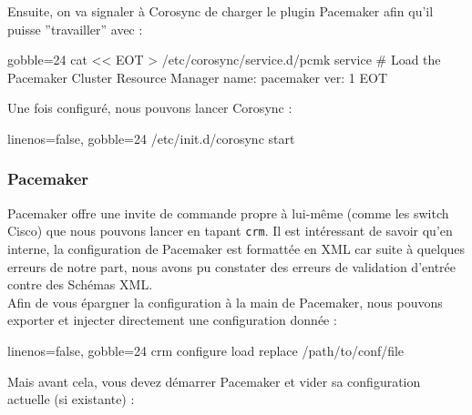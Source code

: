 \documentclass[11pt,a4paper]{report}
\begin{document}
                    Ensuite, on va signaler \`a Corosync de charger le plugin Pacemaker afin qu'il puisse ''travailler'' avec :\\
                    
                    \begin{bashcode*}{gobble=24}
                        cat << EOT > /etc/corosync/service.d/pcmk
                        service {
                                # Load the Pacemaker Cluster Resource Manager
                                name: pacemaker
                                ver:  1
                        }
                        EOT
                    \end{bashcode*}
                    
                    Une fois configur\'e, nous pouvons lancer Corosync :\\
                    
                    \begin{bashcode*}{linenos=false, gobble=24}
                        /etc/init.d/corosync start
                    \end{bashcode*}
                    
                \subsubsection{Pacemaker}
                    
                    Pacemaker offre une invite de commande propre \`a lui-m\^eme (comme les switch Cisco) que nous pouvons lancer en tapant \verb+crm+. Il est int\'eressant de savoir qu'en interne, la configuration de Pacemaker est formatt\'ee en XML car suite \`a quelques erreurs de notre part, nous avons pu constater des erreurs de validation d'entr\'ee contre des Sch\'emas XML.\\
                    
                    Afin de vous \'epargner la configuration \`a la main de Pacemaker, nous pouvons exporter et injecter directement une configuration donn\'ee :\\
                    
                    \begin{bashcode*}{linenos=false, gobble=24}
                        crm configure load replace /path/to/conf/file
                    \end{bashcode*}
                    
                    Mais avant cela, vous devez d\'emarrer Pacemaker et vider sa configuration actuelle (si existante) :\\
                    
\end{document}
